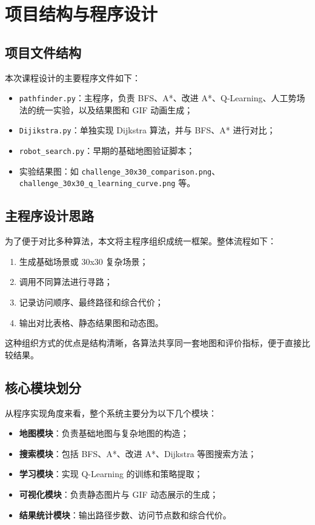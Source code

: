 \chapter{项目结构与程序设计}\label{chap:structure}

\section{项目文件结构}

本次课程设计的主要程序文件如下：

\begin{itemize}
  \item \texttt{pathfinder.py}：主程序，负责 BFS、A*、改进 A*、Q-Learning、人工势场法的统一实验，以及结果图和 GIF 动画生成；
  \item \texttt{Dijikstra.py}：单独实现 Dijkstra 算法，并与 BFS、A* 进行对比；
  \item \texttt{robot\_search.py}：早期的基础地图验证脚本；
  \item 实验结果图：如 \texttt{challenge\_30x30\_comparison.png}、\texttt{challenge\_30x30\_q\_learning\_curve.png} 等。
\end{itemize}

\section{主程序设计思路}

为了便于对比多种算法，本文将主程序组织成统一框架。整体流程如下：

\begin{enumerate}
  \item 生成基础场景或 30x30 复杂场景；
  \item 调用不同算法进行寻路；
  \item 记录访问顺序、最终路径和综合代价；
  \item 输出对比表格、静态结果图和动态图。
\end{enumerate}

这种组织方式的优点是结构清晰，各算法共享同一套地图和评价指标，便于直接比较结果。

\section{核心模块划分}

从程序实现角度来看，整个系统主要分为以下几个模块：

\begin{itemize}
  \item \textbf{地图模块}：负责基础地图与复杂地图的构造；
  \item \textbf{搜索模块}：包括 BFS、A*、改进 A*、Dijkstra 等图搜索方法；
  \item \textbf{学习模块}：实现 Q-Learning 的训练和策略提取；
  \item \textbf{可视化模块}：负责静态图片与 GIF 动态展示的生成；
  \item \textbf{结果统计模块}：输出路径步数、访问节点数和综合代价。
\end{itemize}

